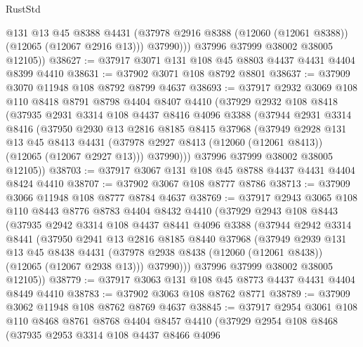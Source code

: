 \begin{lexlean}{RustStd}
\begin{coremodule}
              @131
              @13
              @45
              @8388
              @4431
              (@37978 @2916 @8388 (@12060 (@12061 @8388)) (@12065 (@12067 @2916 @13)))
              @37990)))
        @37996
        @37999
        @38002
        @38005
        @12105))
@38627 := @37917 @3071 @131 @108 @45 @8803 @4437 @4431 @4404 @8399 @4410
@38631 := @37902 @3071 @108 @8792 @8801
@38637 := @37909 @3070 @11948 @108 @8792 @8799 @4637
@38693 := @37917
    @2932
    @3069
    @108
    @110
    @8418
    @8791
    @8798
    @4404
    @8407
    @4410
    (@37929
      @2932
      @108
      @8418
      (@37935
        @2931
        @3314
        @108
        @4437
        @8416
        @4096
        @3388
        (@37944
          @2931
          @3314
          @8416
          (@37950
            @2930
            @13
            @2816
            @8185
            @8415
            @37968
            (@37949
              @2928
              @131
              @13
              @45
              @8413
              @4431
              (@37978 @2927 @8413 (@12060 (@12061 @8413)) (@12065 (@12067 @2927 @13)))
              @37990)))
        @37996
        @37999
        @38002
        @38005
        @12105))
@38703 := @37917 @3067 @131 @108 @45 @8788 @4437 @4431 @4404 @8424 @4410
@38707 := @37902 @3067 @108 @8777 @8786
@38713 := @37909 @3066 @11948 @108 @8777 @8784 @4637
@38769 := @37917
    @2943
    @3065
    @108
    @110
    @8443
    @8776
    @8783
    @4404
    @8432
    @4410
    (@37929
      @2943
      @108
      @8443
      (@37935
        @2942
        @3314
        @108
        @4437
        @8441
        @4096
        @3388
        (@37944
          @2942
          @3314
          @8441
          (@37950
            @2941
            @13
            @2816
            @8185
            @8440
            @37968
            (@37949
              @2939
              @131
              @13
              @45
              @8438
              @4431
              (@37978 @2938 @8438 (@12060 (@12061 @8438)) (@12065 (@12067 @2938 @13)))
              @37990)))
        @37996
        @37999
        @38002
        @38005
        @12105))
@38779 := @37917 @3063 @131 @108 @45 @8773 @4437 @4431 @4404 @8449 @4410
@38783 := @37902 @3063 @108 @8762 @8771
@38789 := @37909 @3062 @11948 @108 @8762 @8769 @4637
@38845 := @37917
    @2954
    @3061
    @108
    @110
    @8468
    @8761
    @8768
    @4404
    @8457
    @4410
    (@37929
      @2954
      @108
      @8468
      (@37935
        @2953
        @3314
        @108
        @4437
        @8466
        @4096

\end{coremodule}
\end{lexlean}
